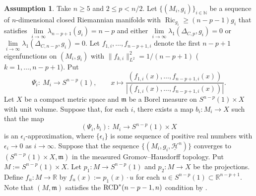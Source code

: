 \documentclass[10pt,a4paper]{amsart}
\numberwithin{equation}{section}
\theoremstyle{definition}
\newtheorem{Asu}[Thm]{Assumption}
\newcommand{\Ric}{\operatorname{Ric}}
\newcommand{\R}{\mathbb{R}}
\newcommand{\mf}{\mathfrak{m}}
\newcommand{\RCD}{{\rm RCD}^\ast}
\newcommand{\nHa}{\underline{\mathcal{H}}}
\begin{document}
\begin{Asu}\label{convX}
Take $n\geq 5$ and $2\leq p < n/2$.
Let $\{(M_i,g_i)\}_{i\in\mathbb{N}}$ be a sequence of $n$-dimen\-sional closed Riemannian manifolds with $\Ric_{g_i}\geq (n-p-1)g_i$ that satisfies $\lim\limits_{i\to\infty}\lambda_{n-p+1}(g_i)=n-p$ and either $\lim\limits_{i\to \infty}\lambda_1(\Delta_{C,p},g_i)=0$ or $\lim\limits_{i\to \infty}\lambda_1(\Delta_{C,n-p},g_i)=0$.
Let $f_{1,i},\ldots,f_{n-p+1,i}$ denote the first $n-p+1$ eigenfunctions on $(M_i,g_i)$ with $\|f_{k,i}\|_{L^2}^2=1/(n-p+1)$ ($k=1,\ldots,n-p+1$).
Put
\[
\Psi_i\colon\  M_i\to S^{n-p}(1),\qquad
x\mapsto \frac{(f_{1,i}(x),\ldots,f_{n-p+1,i}(x))}{|(f_{1,i}(x),\ldots,f_{n-p+1,i}(x))|}.
\]
Let $X$ be a compact metric space and $\mf$ be a Borel measure on $S^{n-p}(1)\times X$
with unit volume.
Suppose that, for each $i$, there exists a map $b_i\colon M_i\to X$ such that
the map
\[
(\Psi_i,b_i)\colon\ M_i\to S^{n-p}(1)\times X
\]
is an $\epsilon_i$-approximation, where $\{\epsilon_i\}$ is some sequence of positive real numbers with $\epsilon_i\to 0$ as $i\to \infty$.
Suppose that the sequence $\{(M_i,g_i, \nHa^n)\}$ converges to $(S^{n-p}(1)\times X,\mf)$ in the measured Gromov--Hausdorff topology.
Put $M:=S^{n-p}(1)\times X$.
Let
$p_1\colon M\to S^{n-p}(1)$ and $p_2\colon M\to X$ be the projections.
Define
$f_u\colon M\to\R$ by $f_u(x):=p_1(x)\cdot u$ for each $u\in S^{n-p}(1)\subset \R^{n-p+1}$.
Note that $(M,\mf)$ satisfies the $\RCD(n-p-1,n)$ condition by \cite[Theorem~3.22]{EKS}.
\end{Asu}
\end{document}
